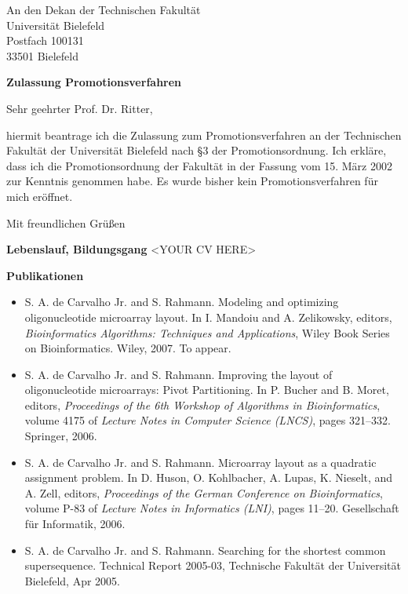 \documentclass[a4paper,11pt]{letter}
\begin{document}
\begin{letter}{An den Dekan der Technischen Fakult\"at\\ Universit\"at Bielefeld\\ Postfach 100131\\ 33501 Bielefeld}
\opening{ {\bf Zulassung Promotionsverfahren}}

Sehr geehrter Prof. Dr. Ritter,

hiermit beantrage ich die Zulassung zum Promotionsverfahren an der Technischen Fakult\"at der Universit\"at Bielefeld nach
\S3 der Promotionsordnung. Ich erkl\"are, dass ich die Promotionsordnung der Fakult\"at in der Fassung vom 15. M\"arz 2002 zur 
Kenntnis genommen habe. Es wurde bisher kein Promotionsverfahren f\"ur mich er\"offnet.

\closing{Mit freundlichen Gr\"u{\ss}en}
\newpage

{\bf\large Lebenslauf, Bildungsgang}
<YOUR CV HERE>

{\bf\large Publikationen}

\begin{itemize}
\item S. A. de Carvalho Jr. and S. Rahmann. Modeling and optimizing
oligonucleotide microarray layout. In I. Mandoiu and A. Zelikowsky, editors,
\emph{Bioinformatics Algorithms: Techniques and Applications}, Wiley Book Series
on Bioinformatics. Wiley, 2007. To appear.

\item S. A. de Carvalho Jr. and S. Rahmann. Improving the layout of
oligonucleotide microarrays: Pivot Partitioning. In P. Bucher and B. Moret,
editors, \emph{Proceedings of the 6th Workshop of Algorithms in Bioinformatics},
volume 4175 of \emph{Lecture Notes in Computer Science (LNCS)}, pages 321--332.
Springer, 2006.

\item S. A. de Carvalho Jr. and S. Rahmann. Microarray layout as a quadratic
assignment problem. In D. Huson, O. Kohlbacher, A. Lupas, K. Nieselt, and A.
Zell, editors, \emph{Proceedings of the German Conference on Bioinformatics},
volume P-83 of \emph{Lecture Notes in Informatics (LNI)}, pages 11--20.
Gesellschaft f\"ur Informatik, 2006.

\item S. A. de Carvalho Jr. and S. Rahmann. Searching for the shortest common
supersequence. Technical Report 2005-03, Technische Fakult\"at der Universit\"at
Bielefeld, Apr 2005.
\end{itemize}

\end{letter}
\end{document}
